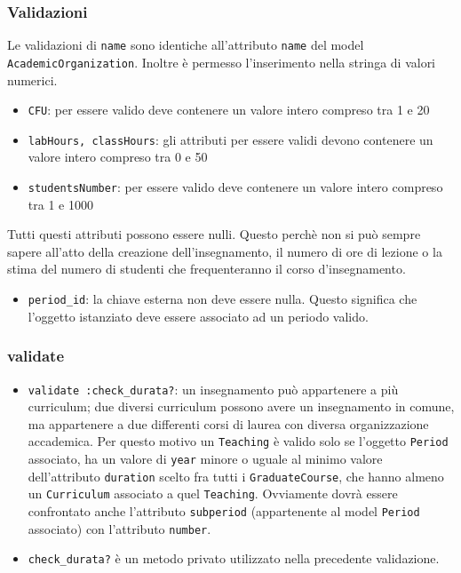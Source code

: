\documentclass[11pt,a4paper]{article}
\begin{document}
\subsubsection*{Validazioni}
Le validazioni di \verb|name| sono identiche all'attributo \verb|name| del model \\ \verb|AcademicOrganization|. Inoltre è permesso l'inserimento nella stringa di valori numerici.
\begin{itemize}
 \item \verb|CFU|: per essere valido deve contenere un valore intero compreso tra 1 e 20
 \item \verb|labHours, classHours|: gli attributi per essere validi devono contenere un valore intero compreso tra 0 e 50
\item \verb|studentsNumber|: per essere valido deve contenere un valore intero compreso tra 1 e 1000
\end{itemize}
Tutti questi attributi possono essere nulli. Questo perchè non si può sempre sapere all'atto della creazione dell'insegnamento, il numero di ore di lezione o la stima del numero di studenti che frequenteranno il corso d'insegnamento.
\begin{itemize}
 \item \verb|period_id|: la chiave esterna non deve essere nulla. Questo significa che l'oggetto istanziato deve essere associato ad un periodo valido.
\end{itemize}
\subsubsection*{validate}
\begin{itemize}
\item \verb|validate :check_durata?|: un insegnamento può appartenere a più curriculum; due diversi curriculum possono avere un insegnamento in comune, ma appartenere a due differenti corsi di laurea con diversa organizzazione accademica.
Per questo motivo un \verb|Teaching| è valido solo se l'oggetto \verb|Period| associato, ha un valore di \verb|year| minore o uguale al minimo valore dell'attributo \verb|duration| scelto fra tutti i \verb|GraduateCourse|, che hanno almeno un \verb|Curriculum| associato a quel \verb|Teaching|. Ovviamente dovrà essere confrontato anche l'attributo \verb|subperiod| (appartenente al model \verb|Period| associato) con l'attributo \verb|number|.
\item \verb|check_durata?| è un metodo privato utilizzato nella precedente validazione.
\end{itemize}
\end{document}
